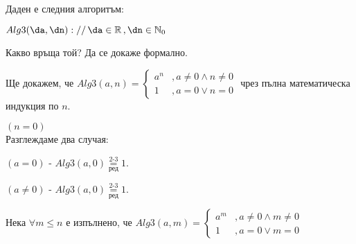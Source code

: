 \begin{problem}
	Даден е следния алгоритъм:
	\begin{pseudocode}
		
		$Alg3(\da,\dn)://\,\da\in\mathbb{R}\,,\dn\in\mathbb{N}_0$
		\Mybegin
		{
			
			
		}
	\end{pseudocode}
	Какво връща той? Да се докаже формално.
\end{problem}
\begin{solution}
	Ще докажем, че $Alg3(a,n)=\begin{cases}
		a^n &,a\ne0\land n\ne0\\
		1   &,a=0\lor n=0
	\end{cases}$ чрез пълна математическа индукция по $n$.
\end{solution}
\begin{base}
	$(n=0)$\\Разглеждаме два случая:
	\begin{mycase}
		\item $(a=0)$ - $Alg3(a,0)\underset{\text{ред}}{\overset{\text{2-3}}=}1$.
		\item $(a\ne0)$ - $Alg3(a,0)\underset{\text{ред}}{\overset{\text{2-3}}=}1$.
	\end{mycase}
\end{base}
\begin{indhypothesis}
	Нека $\forall m\le n$ е изпълнено, че $Alg3(a,m)=\begin{cases}
		a^m &,a\ne0\land m\ne0\\
		1   &,a=0\lor m=0
	\end{cases}$
\end{indhypothesis}
